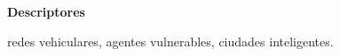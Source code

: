\vspace{2em}

{\Large\bfseries\sectionfont Descriptores}
\vspace{3\medskipamount}

redes vehiculares, agentes vulnerables, ciudades inteligentes.

\cleardoublepage\tableofcontents
\cleardoublepage\listoffigures
\cleardoublepage\listoftables
\cleardoublepage\listoflistings

\mainmatter
\pagestyle{phdthesis}

